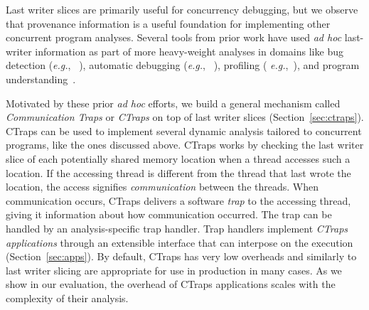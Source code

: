 \documentclass[preprint,9pt]{sigplanconf}
\newcommand{\ctraps}{CTraps\xspace}
\begin{document}
Last writer slices are primarily useful for concurrency debugging, but we 
observe that provenance information is a
useful foundation for implementing other concurrent program analyses.  Several
tools from prior work have used {\em ad hoc} last-writer information as part of
more heavy-weight analyses in domains like bug detection ({\em e.g.},
~\cite{dmtracker,avio}), automatic debugging ({\em e.g.},
~\cite{recon,conseq,cci}), profiling ({\em
e.g.},~\cite{threadclustering, schedpredictionmodel}), and program
understanding~\cite{oshatr}. 

Motivated by these prior {\em ad hoc} efforts, we build a general mechanism
called {\em Communication Traps} or {\em \ctraps} on top of last writer slices
(Section~\ref{sec:ctraps}). \ctraps can be used to implement several dynamic
analysis tailored to concurrent programs, like the ones discussed above.
\ctraps works by checking the last writer slice of each potentially shared
memory location when a thread accesses such a location. If the accessing
thread is different from the thread that last wrote the location, the access
signifies {\em communication} between the threads. When communication occurs,
\ctraps delivers a software {\em trap} to the accessing thread, giving it
information about how communication occurred. The trap can be handled by an
analysis-specific trap handler. Trap handlers implement {\em \ctraps
applications} through an extensible interface that can interpose on the
execution (Section~\ref{sec:apps}). By default, \ctraps has very low overheads
and similarly to last writer slicing are appropriate for use in production in
many cases. 
As we show in our evaluation, the
overhead of \ctraps applications scales with the complexity of their analysis.



%
\end{document}
